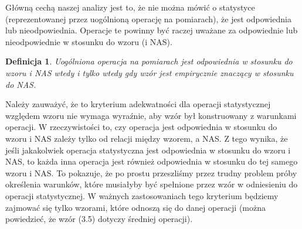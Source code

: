 \documentclass[12pt,a4paper]{report}
\newtheorem{definition}{Definicja}[chapter]
\begin{document}
Główną cechą naszej analizy jest to, że nie można mówić o statystyce (reprezentowanej przez uogólnioną operację na pomiarach), że jest odpowiednia lub nieodpowiednia. Operacje te powinny być raczej uważane za odpowiednie lub nieodpowiednie w stosunku do wzoru (i NAS).
\begin{definition}
Uogólniona operacja na pomiarach jest odpowiednia w stosunku do wzoru i NAS wtedy i tylko wtedy gdy wzór jest empirycznie znaczący w stosunku do NAS.
\end{definition}

Należy zauważyć, że to kryterium adekwatności dla operacji statystycznej względem wzoru nie wymaga wyraźnie, aby wzór był konstruowany z warunkami operacji. W rzeczywistości to, czy operacja jest odpowiednia w stosunku do wzoru i NAS zależy tylko od relacji między wzorem, a NAS. Z tego wynika, że jeśli jakakolwiek operacja statystyczna jest odpowiednia w stosunku do wzoru i NAS, to każda inna operacja jest również odpowiednia w stosunku do tej samego wzoru i NAS. To pokazuje, że po prostu przeszliśmy przez trudny problem próby określenia warunków, które musiałyby być spełnione przez wzór w odniesieniu do operacji statystycznej. W ważnych zastosowaniach tego kryterium będziemy zajmować się tylko wzorami, które odnoszą się do danej operacji (można powiedzieć, że wzór (3.5) dotyczy średniej operacji).
\end{document}
